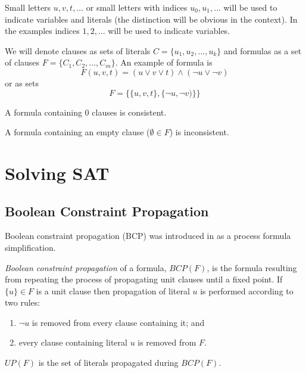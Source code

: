 Small letters $u, v, t, \ldots$ or small letters with indices $u_0,
u_1, \ldots$ will be used to indicate variables and literals (the
distinction will be obvious in the context). In the examples
indices $1, 2, \ldots$ will be used to indicate variables.

We will denote clauses as sets of literals $C = \{ u_1, u_2, \ldots,
u_k \}$ and formulas as a set of clauses $F = \{ C_1, C_2, \ldots,
C_m \} $.  An example of formula is
\[
F(u, v, t) = (u \lor v \lor t) \land (\neg u \lor \neg v)
\]
or as sets
\[
F = \{ \{u, v, t\}, \{\neg u, \neg v)\}\}
\]

\begin{myprop}
  A formula containing 0 clauses is consistent.
\end{myprop}

\begin{myprop}
  A formula containing an empty clause ($\emptyset \in F$) is inconsistent.
\end{myprop}


\section{Solving SAT}
\label{sec:solving-sat}

\subsection{Boolean Constraint Propagation}
\label{ssec:bcp}

Boolean constraint propagation (BCP) was introduced in
\cite{Davis:1960:CPQ:321033.321034} as a process formula
simplification.

\begin{mydef}
  \emph{Boolean constraint propagation} of a formula, $BCP(F)$, is
  the formula resulting from repeating the process of propagating
  unit clauses until a fixed point. If $\{ u \} \in F$ is a unit
  clause then propagation of literal
  $u$ is performed according to two rules:
  \begin{enumerate}
    \item $\neg u$ is removed from every clause containing it; and
    \item every clause containing literal $u$ is removed from $F$.
  \end{enumerate}
\end{mydef}

\begin{mydef}
$UP(F)$ is the set of literals propagated during $BCP(F)$.
\end{mydef}

